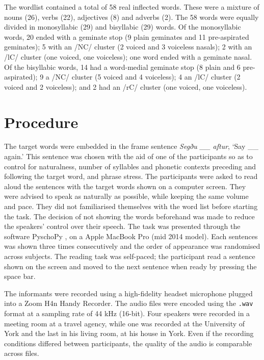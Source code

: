 The wordlist contained a total of 58 real inflected words.
These were a mixture of nouns (26), verbs (22), adjectives (8) and adverbs (2).
The 58 words were equally divided in monosyllabic (29) and bisyllabic (29) words.
Of the monosyllabic words, 20 ended with a geminate stop (9 plain geminates and 11 pre-aspirated geminates); 5 with an /NC/ cluster (2 voiced and 3 voiceless nasals); 2 with an /lC/ cluster (one voiced, one voiceless); one word ended with a geminate nasal.
Of the bisyllabic words, 14 had a word-medial geminate stop (8 plain and 6 pre-aspirated); 9 a /NC/ cluster (5 voiced and 4 voiceless); 4 an /lC/ cluster (2 voiced and 2 voiceless); and 2 had an /rC/ cluster (one voiced, one voiceless).



\section{Procedure}

The target words were embedded in the frame sentence \textit{Segðu \_\_ aftur}, `Say \_\_ again.'
This sentence was chosen with the aid of one of the participants so as to control for naturalness, number of syllables and phonetic contexts preceding and following the target word, and phrase stress.
The participants were asked to read aloud the sentences with the target words shown on a computer screen.
They were advised to speak as naturally as possible, while keeping the same volume and pace.
They did not familiarised themselves with the word list before starting the task.
The decision of not showing the words beforehand was made to reduce the speakers' control over their speech.
The task was presented through the software PyschoPy \citep{peirce2009}, on a Apple MacBook Pro (mid 2014 model).
Each sentences was shown three times consecutively and the order of appearance was randomised across subjects.
The reading task was self-paced; the participant read a sentence shown on the screen and moved to the next sentence when ready by pressing the space bar.

The informants were recorded using a high-fidelity headset microphone plugged into a Zoom H4n Handy Recorder.
The audio files were encoded using the \texttt{.wav} format at a sampling rate of 44 kHz (16-bit).
Four speakers were recorded in a meeting room at a travel agency, while one was recorded at the University of York and the last in his living room, at his house in York.
Even if the recording conditions differed between participants, the quality of the audio is comparable across files.


